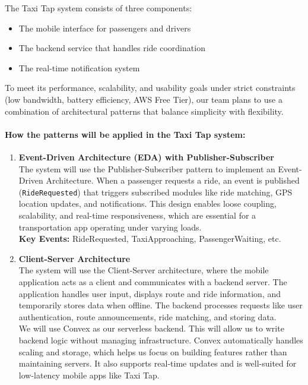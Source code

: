 \documentclass[a4paper,12pt]{article}
\begin{document}
The Taxi Tap system consists of three components:
\begin{itemize}
    \item The mobile interface for passengers and drivers
    \item The backend service that handles ride coordination
    \item The real-time notification system
\end{itemize}

To meet its performance, scalability, and usability goals under strict constraints (low bandwidth, battery efficiency, AWS Free Tier), our team plans to use a combination of architectural patterns that balance simplicity with flexibility.

\paragraph{How the patterns will be applied in the Taxi Tap system:}

\begin{enumerate}
    \item \textbf{Event-Driven Architecture (EDA) with Publisher-Subscriber}\\
    The system will use the Publisher-Subscriber pattern to implement an Event-Driven Architecture. When a passenger requests a ride, an event is published (\texttt{RideRequested}) that triggers subscribed modules like ride matching, GPS location updates, and notifications. This design enables loose coupling, scalability, and real-time responsiveness, which are essential for a transportation app operating under varying loads.\\
    \textbf{Key Events:} RideRequested, TaxiApproaching, PassengerWaiting, etc.

    \item \textbf{Client-Server Architecture}\\
    The system will use the Client-Server architecture, where the mobile application acts as a client and communicates with a backend server. The application handles user input, displays route and ride information, and temporarily stores data when offline. The backend processes requests like user authentication, route announcements, ride matching, and storing data.\\
    We will use Convex as our serverless backend. This will allow us to write backend logic without managing infrastructure. Convex automatically handles scaling and storage, which helps us focus on building features rather than maintaining servers. It also supports real-time updates and is well-suited for low-latency mobile apps like Taxi Tap. 
\end{enumerate}
\end{document}
